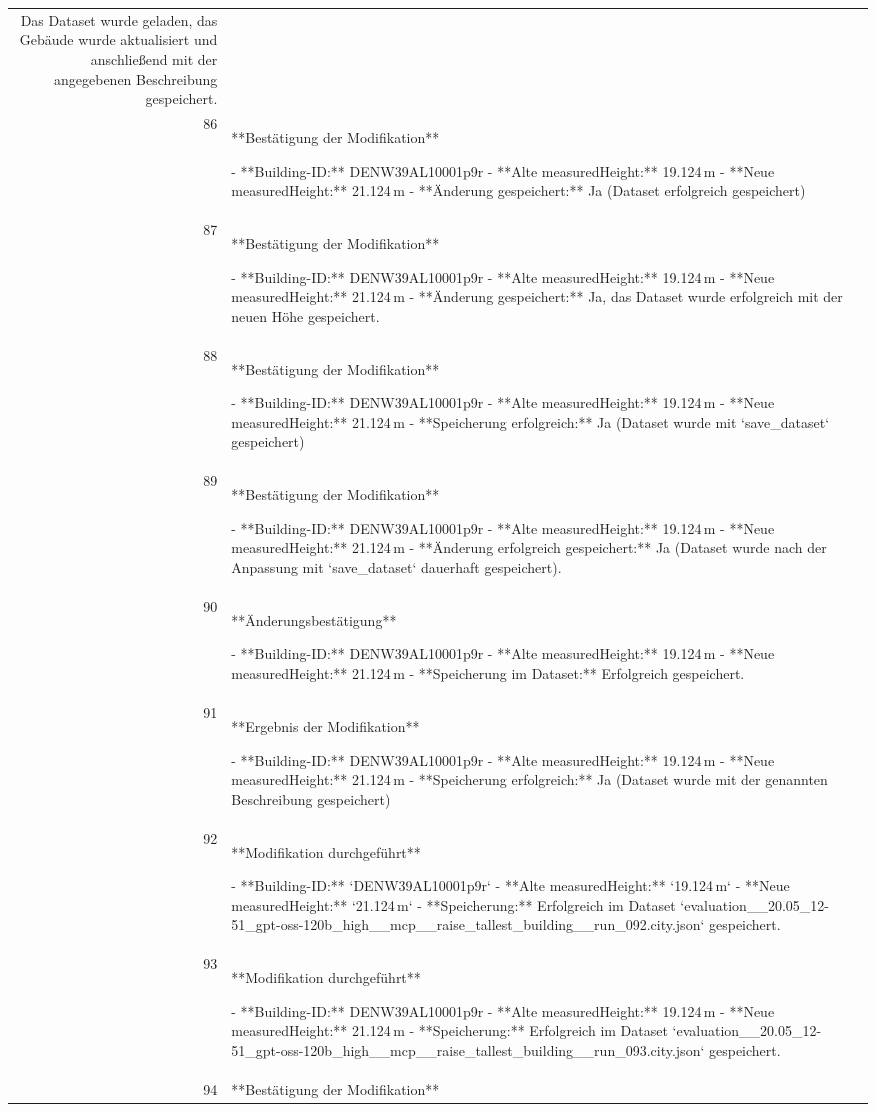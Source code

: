 \documentclass[a4paper,11pt]{article}
\begin{document}
\begin{table}[ht]
\begin{tabular}{r p{12cm}}
Das Dataset wurde geladen, das Gebäude wurde aktualisiert und anschließend mit der angegebenen Beschreibung gespeichert. \\
86 & **Bestätigung der Modifikation**

- **Building-ID:** DENW39AL10001p9r  
- **Alte measuredHeight:** 19.124 m  
- **Neue measuredHeight:** 21.124 m  
- **Änderung gespeichert:** Ja (Dataset erfolgreich gespeichert) \\
87 & **Bestätigung der Modifikation**

- **Building-ID:** DENW39AL10001p9r  
- **Alte measuredHeight:** 19.124 m  
- **Neue measuredHeight:** 21.124 m  
- **Änderung gespeichert:** Ja, das Dataset wurde erfolgreich mit der neuen Höhe gespeichert. \\
88 & **Bestätigung der Modifikation**

- **Building-ID:** DENW39AL10001p9r  
- **Alte measuredHeight:** 19.124 m  
- **Neue measuredHeight:** 21.124 m  
- **Speicherung erfolgreich:** Ja (Dataset wurde mit `save\_dataset` gespeichert) \\
89 & **Bestätigung der Modifikation**

- **Building-ID:** DENW39AL10001p9r  
- **Alte measuredHeight:** 19.124 m  
- **Neue measuredHeight:** 21.124 m  
- **Änderung erfolgreich gespeichert:** Ja (Dataset wurde nach der Anpassung mit `save\_dataset` dauerhaft gespeichert). \\
90 & **Änderungsbestätigung**

- **Building-ID:** DENW39AL10001p9r  
- **Alte measuredHeight:** 19.124 m  
- **Neue measuredHeight:** 21.124 m  
- **Speicherung im Dataset:** Erfolgreich gespeichert. \\
91 & **Ergebnis der Modifikation**

- **Building-ID:** DENW39AL10001p9r  
- **Alte measuredHeight:** 19.124 m  
- **Neue measuredHeight:** 21.124 m  
- **Speicherung erfolgreich:** Ja (Dataset wurde mit der genannten Beschreibung gespeichert) \\
92 & **Modifikation durchgeführt**

- **Building-ID:** `DENW39AL10001p9r`  
- **Alte measuredHeight:** `19.124 m`  
- **Neue measuredHeight:** `21.124 m`  
- **Speicherung:** Erfolgreich im Dataset `evaluation\_\_20.05\_12-51\_gpt-oss-120b\_high\_\_mcp\_\_raise\_tallest\_building\_\_run\_092.city.json` gespeichert. \\
93 & **Modifikation durchgeführt**

- **Building-ID:** DENW39AL10001p9r  
- **Alte measuredHeight:** 19.124 m  
- **Neue measuredHeight:** 21.124 m  
- **Speicherung:** Erfolgreich im Dataset `evaluation\_\_20.05\_12-51\_gpt-oss-120b\_high\_\_mcp\_\_raise\_tallest\_building\_\_run\_093.city.json` gespeichert. \\
94 & **Bestätigung der Modifikation**


\end{tabular}
\end{table}
\end{document}
